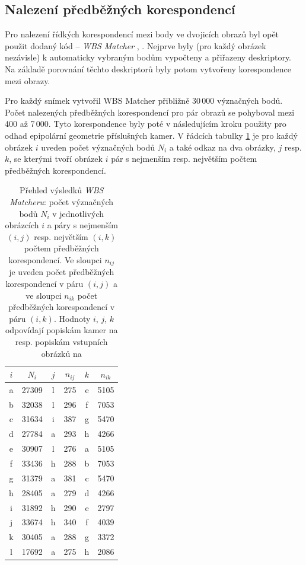 \documentclass[11pt,oneside,a4paper,pdftex]{article}   %
\begin{document}
	\subsection{Nalezení předběžných korespondencí}

		Pro nalezení řídkých korespondencí mezi body ve dvojicích obrazů byl opět použit dodaný kód --
		\emph{WBS Matcher} \cite{code_repo}, \cite{WBS_Matcher}.  Nejprve byly (pro každý obrázek
		nezávisle) k automaticky vybraným  bodům vypočteny a přiřazeny deskriptory. Na
		základě porovnání těchto deskriptorů byly potom vytvořeny korespondence mezi obrazy.
		
		Pro každý snímek vytvořil WBS Matcher přibližně 30\,000 význačných bodů. Počet na\-le\-ze\-ných
		před\-běž\-ných ko\-res\-pon\-den\-cí pro pár obrazů se pohyboval mezi 400 až 7\,000. Tyto korespondence byly
		poté v následujícím kroku použity pro odhad epipolární geometrie pří\-slu\-šných kamer.  V
		řádcích tabulky \ref{tabWbsFeatures} je pro každý obrázek $i$ uveden počet význačných bodů $N_i$
		a také odkaz na dva obrázky, $j$ resp. $k$, se kterými tvoří obrázek $i$ pár s nejmenším resp.
		největším počtem předběžných korespondencí.
		
			\begin{table}[h]
				\centering
				\begin{tabular}{|c|c|cccc|}
					\hline
					$i$ & $N_i$ & $j$ & $n_{ij}$ & $k$ & $n_{ik}$ \\
					\hline
					a & 27309 & l & 275 & e & 5105 \\
					b & 32038 & l & 296 & f & 7053 \\
					c & 31634 & i & 387 & g & 5470 \\
					d & 27784 & a & 293 & h & 4266 \\
					e & 30907 & l & 276 & a & 5105 \\
					f & 33436 & h & 288 & b & 7053 \\
					g & 31379 & a & 381 & c & 5470 \\
					h & 28405 & a & 279 & d & 4266 \\
					i & 31892 & h & 290 & e & 2797 \\
					j & 33674 & h & 340 & f & 4039 \\
					k & 30405 & a & 288 & g & 3372 \\
					l & 17692 & a & 275 & h & 2086 \\
					\hline
				\end{tabular}
				\caption{Přehled výsledků \emph{WBS Matcheru}: počet význačných bodů $N_i$ v jednotlivých
					obrázcích $i$ a páry s nejmenším $(i,j)$ resp. největším $(i,k)$ počtem předběžných
					korespondencí. Ve sloupci $n_{ij}$ je uveden počet předběžných korespondencí v páru
					$(i,j)$ a ve sloupci $n_{ik}$ počet předběžných korespondencí v páru $(i,k)$.
					Hodnoty $i$, $j$, $k$ odpovídají popiskám kamer na  resp.
					popiskám vstupních obrázků na }
				\label{tabWbsFeatures}
			\end{table}
	
\end{document}
